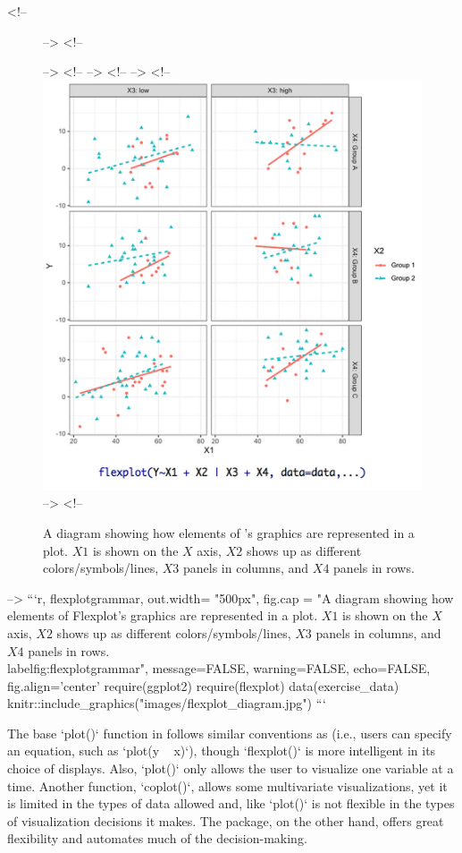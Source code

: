 <!-- \begin{figure}[h] -->
<!-- \caption{A diagram showing how elements of 's graphics are represented in a plot. $X1$ is shown on the $X$ axis, $X2$ shows up as different colors/symbols/lines, $X3$ panels in columns, and $X4$ panels in rows.} -->
<!-- \label{fig:flexplotgrammar} -->
<!-- \centering -->
<!-- \includegraphics[width = 12cm]{images/flexplot_diagram.jpg} -->
<!-- \end{figure} -->
```{r, flexplotgrammar, out.width= "500px", fig.cap = "A diagram showing how elements of Flexplot's graphics are represented in a plot. $X1$ is shown on the $X$ axis, $X2$ shows up as different colors/symbols/lines, $X3$ panels in columns, and $X4$ panels in rows. \\label{fig:flexplotgrammar}", message=FALSE, warning=FALSE, echo=FALSE, fig.align='center'}
require(ggplot2)
require(flexplot)
data(exercise_data)
knitr::include_graphics("images/flexplot_diagram.jpg")
```



The base `plot()` function in  follows similar conventions as  (i.e., users can specify an equation, such as `plot(y  ~  x)`), though `flexplot()` is more intelligent in its choice of displays. Also, `plot()` only allows the user to visualize one variable at a time. Another function, `coplot()`, allows some multivariate visualizations, yet it is limited in the types of data allowed and, like `plot()` is not flexible in the types of visualization decisions it makes. The  package, on the other hand, offers great flexibility and automates much of the decision-making. 

